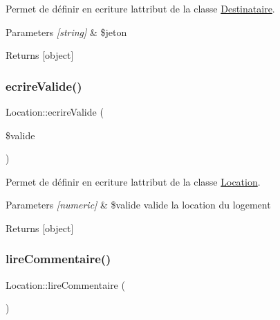 Permet de définir en ecriture l\textquotesingle{}attribut de la classe \hyperlink{class_destinataire}{Destinataire}. 


\begin{DoxyParams}{Parameters}
{\em \mbox{[}string\mbox{]}} & \$jeton \\
\hline
\end{DoxyParams}
\begin{DoxyReturn}{Returns}
\mbox{[}object\mbox{]} 
\end{DoxyReturn}
\mbox{\label{class_location_a8b7b36fcfac26bd53bd8dacc23754af1}} 
\subsubsection{\texorpdfstring{ecrire\+Valide()}{ecrireValide()}}
{\footnotesize\ttfamily Location\+::ecrire\+Valide (\begin{DoxyParamCaption}\item[{}]{\$valide }\end{DoxyParamCaption})}



Permet de définir en ecriture l\textquotesingle{}attribut de la classe \hyperlink{class_location}{Location}. 


\begin{DoxyParams}{Parameters}
{\em \mbox{[}numeric\mbox{]}} & \$valide valide la location du logement \\
\hline
\end{DoxyParams}
\begin{DoxyReturn}{Returns}
\mbox{[}object\mbox{]} 
\end{DoxyReturn}
\mbox{\label{class_location_a660ded4be3f297397899580904897074}} 
\subsubsection{\texorpdfstring{lire\+Commentaire()}{lireCommentaire()}}
{\footnotesize\ttfamily Location\+::lire\+Commentaire (\begin{DoxyParamCaption}{ }\end{DoxyParamCaption})}



